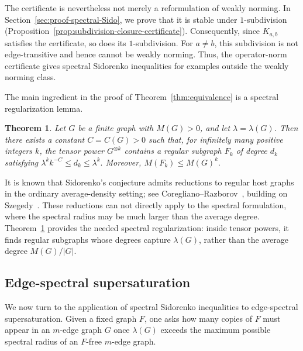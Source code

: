 \documentclass[10pt,a4paper]{amsart}
\newtheorem{theorem}{Theorem}[section]
\begin{document}
The certificate is nevertheless not merely a reformulation of weakly
norming.  In Section~\ref{sec:proof-spectral-Sido}, we prove that it is
stable under \(1\)-subdivision (Proposition~\ref{prop:subdivision-closure-certificate}).  Consequently, since \(K_{a,b}\) satisfies
the certificate, so does its \(1\)-subdivision.  For \(a\ne b\), this
subdivision is not edge-transitive and hence cannot be weakly norming. Thus, the operator-norm certificate gives spectral
Sidorenko inequalities for examples outside the weakly norming class.


The main ingredient in the proof of Theorem~\ref{thm:equivalence} is a
spectral regularization lemma.

\begin{theorem}
\label{thm:regular-subgraphs}
Let \(G\) be a finite graph with \(M(G)>0\), and let
\(\lambda=\lambda(G)\).  Then there exists a constant \(C=C(G)>0\) such
that, for infinitely many positive integers \(k\), the tensor power
\(G^{\otimes k}\) contains a regular subgraph \(F_k\) of degree \(d_k\)
satisfying      $\lambda^k k^{-C}\le d_k\le \lambda^k .$
Moreover, $ M(F_k)\le M(G)^k.$
\end{theorem}

It is known that Sidorenko's conjecture admits reductions to
regular host graphs in the ordinary average-density setting; see
Coregliano--Razborov~\cite{CoreglianoRazborov2021Biregularity}, building
on Szegedy~\cite{Szegedy2015SparseGraphLimits}.  These reductions can not
directly apply to the spectral formulation, where the spectral radius may
be much larger than the average degree.  Theorem~\ref{thm:regular-subgraphs}
provides the needed spectral regularization: inside tensor powers, it
finds regular subgraphs whose degrees capture \(\lambda(G)\), rather
than the average degree \(M(G)/|G|\).


\subsection{Edge-spectral supersaturation}

We now turn to the application of spectral Sidorenko inequalities to
edge-spectral supersaturation.  Given a fixed graph \(F\), one asks how
many copies of \(F\) must appear in an \(m\)-edge graph \(G\) once
\(\lambda(G)\) exceeds the maximum possible spectral radius of an
\(F\)-free \(m\)-edge graph.
\end{document}
